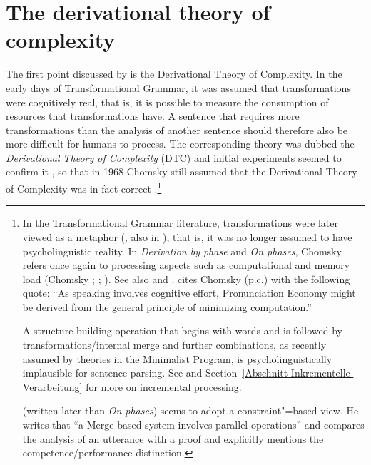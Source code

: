 \section{The derivational theory of complexity}
\label{sec-dtc}

The first point discussed by \citet{SW2011a} is the Derivational Theory of Complexity.
In  the early days of Transformational Grammar,
it was assumed that transformations were cognitively real, that is, it is possible to measure the consumption of resources
that transformations have.
A sentence that requires more transformations than the analysis of another sentence should therefore also be more difficult for humans
to process. The corresponding theory was dubbed the \emph{Derivational Theory of Complexity} (DTC) and initial experiments
seemed to confirm it \citep{MMK64a,SP65a,CO66a}, so that in 1968 Chomsky still assumed that the
\pagebreak
Derivational Theory of Complexity was in fact correct
\citep[--250]{Chomsky76b-u}.\footnote{%
In the Transformational Grammar literature, transformations were later viewed as a metaphor
(\citealp[]{Lohnstein2014a}, also in \citealp[Footnote~4]{Chomsky2001a-u}), that is,
it was no longer assumed to have psycholinguistic reality. In \emph{Derivation by phase} and
\emph{On phases}, Chomsky refers once again to processing aspects such as computational and memory load (Chomsky \citeyear[, 12,
   15]{Chomsky2001a-u}; \citeyear[, 12]{Chomsky2007a}; \citeyear[, 145, 146,
   155]{Chomsky2008a}). See also  and
. \citet[]{Trinh2011a} cites Chomsky (p.c.) with the following quote:
``As speaking involves cognitive effort, Pronunciation Economy might be derived from the general principle of minimizing computation.'' 

  A structure building operation that begins with words and is followed by transformations/internal
  merge and further combinations, as recently assumed by theories in the Minimalist Program,
  is psycholinguistically implausible for sentence parsing. See  and Section~\ref{Abschnitt-Inkrementelle-Verarbeitung} for
  more on incremental processing.

  \citet[]{Chomsky2007a} (written later than \emph{On phases}) seems to adopt a constraint"=based view. He writes that ``a Merge-based system involves parallel operations''
  and compares the analysis of an utterance with a proof and explicitly mentions the competence/performance distinction.
} 
